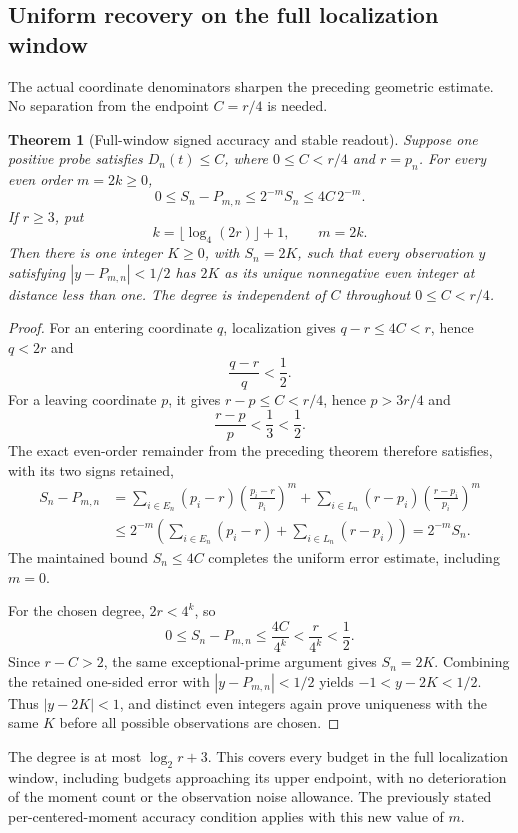 \documentclass[11pt]{article}
\newtheorem{theorem}{Theorem}[section]
\theoremstyle{definition}
\begin{document}
\subsection{Uniform recovery on the full localization window}

The actual coordinate denominators sharpen the preceding geometric
estimate. No separation from the endpoint $C=r/4$ is needed.

\begin{theorem}[Full-window signed accuracy and stable readout]
Suppose one positive probe satisfies $D_n(t)\le C$, where
$0\le C<r/4$ and $r=p_n$. For every even order $m=2k\ge0$,
\[
 0\le S_n-P_{m,n}\le 2^{-m}S_n\le4C\,2^{-m}.
\]
If $r\ge3$, put
\[
 k=\lfloor\log_4(2r)\rfloor+1,\qquad m=2k.
\]
Then there is one integer $K\ge0$, with $S_n=2K$, such that every
observation $y$ satisfying $|y-P_{m,n}|<1/2$ has $2K$ as its
unique nonnegative even integer at distance less than one.
The degree is independent of $C$ throughout $0\le C<r/4$.
\end{theorem}
\begin{proof}
For an entering coordinate $q$, localization gives
$q-r\le4C<r$, hence $q<2r$ and
\[
 \frac{q-r}{q}<\frac12.
\]
For a leaving coordinate $p$, it gives
$r-p\le C<r/4$, hence $p>3r/4$ and
\[
 \frac{r-p}{p}<\frac13<\frac12.
\]
The exact even-order remainder from the preceding theorem therefore
satisfies, with its two signs retained,
\[
\begin{split}
 S_n-P_{m,n}
 &=\sum_{i\in E_n}(p_i-r)
       \left(\frac{p_i-r}{p_i}\right)^m
   +\sum_{i\in L_n}(r-p_i)
       \left(\frac{r-p_i}{p_i}\right)^m\\
 &\le2^{-m}
    \left(\sum_{i\in E_n}(p_i-r)+\sum_{i\in L_n}(r-p_i)\right)
 =2^{-m}S_n.
\end{split}
\]
The maintained bound $S_n\le4C$ completes the uniform error estimate,
including $m=0$.

For the chosen degree, $2r<4^k$, so
\[
 0\le S_n-P_{m,n}\le\frac{4C}{4^k}
   <\frac r{4^k}<\frac12.
\]
Since $r-C>2$, the same exceptional-prime argument gives $S_n=2K$.
Combining the retained one-sided error with
$|y-P_{m,n}|<1/2$ yields $-1<y-2K<1/2$.
Thus $|y-2K|<1$, and distinct even integers again prove uniqueness
with the same $K$ before all possible observations are chosen.
\end{proof}

The degree is at most $\log_2 r+3$. This covers every budget in the
full localization window, including budgets approaching its upper
endpoint, with no deterioration of the moment count or the observation
noise allowance. The previously stated per-centered-moment accuracy
condition applies with this new value of $m$.
\end{document}
